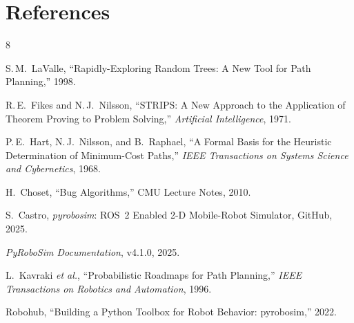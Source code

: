 \documentclass[11pt]{article}
\begin{document}
\section{References}

\begin{thebibliography}{8}

S.\,M.~LaValle, ``Rapidly-Exploring Random Trees: A New Tool for Path Planning,'' 1998.

R.\,E.~Fikes and N.\,J.~Nilsson, ``STRIPS: A New Approach to the Application of Theorem Proving to Problem Solving,'' \emph{Artificial Intelligence}, 1971.

P.\,E.~Hart, N.\,J.~Nilsson, and B.~Raphael, ``A Formal Basis for the Heuristic Determination of Minimum-Cost Paths,'' \emph{IEEE Transactions on Systems Science and Cybernetics}, 1968.

H.~Choset, ``Bug Algorithms,'' CMU Lecture Notes, 2010.

S.~Castro, \emph{pyrobosim}: ROS~2 Enabled 2-D Mobile-Robot Simulator, GitHub, 2025.

\emph{PyRoboSim Documentation}, v4.1.0, 2025.

L.~Kavraki \emph{et al.}, ``Probabilistic Roadmaps for Path Planning,'' \emph{IEEE Transactions on Robotics and Automation}, 1996.

Robohub, ``Building a Python Toolbox for Robot Behavior: pyrobosim,'' 2022.

\end{thebibliography}
\end{document}
